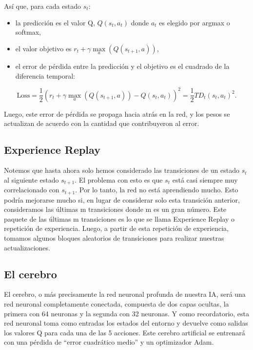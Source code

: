 \documentclass[]{book}
\providecommand{\tightlist}{%
  \setlength{\itemsep}{0pt}\setlength{\parskip}{0pt}}
\begin{document}
Así que, para cada estado \(s_t\):

\begin{itemize}
\tightlist
\item
  la predicción es el valor Q, \(Q (s_t, a_t)\) donde \(a_t\) es elegido por argmax o softmax,
\item
  el valor objetivo es \(r_t + \gamma \underset{a}{\max}(Q(s_{t+1}, a))\),
\item
  el error de pérdida entre la predicción y el objetivo es el cuadrado de la diferencia temporal:
\end{itemize}

\[\textrm{Loss} = \frac{1}{2} \left( r_t + \gamma \underset{a}{\max}(Q(s_{t+1}, a)) - Q(s_t, a_t) \right)^2 = \frac{1}{2} TD_t(s_t, a_t)^2.\]

Luego, este error de pérdida se propaga hacia atrás en la red, y los pesos se actualizan de acuerdo con la cantidad que contribuyeron al error.

\hypertarget{experience-replay}{%
\subsection{Experience Replay}\label{experience-replay}}

Notemos que hasta ahora solo hemos considerado las transiciones de un estado \(s_t\) al siguiente estado \(s_{t + 1}\). El problema con esto es que \(s_t\) está casi siempre muy correlacionado con \(s_{t + 1}\). Por lo tanto, la red no está aprendiendo mucho. Esto podría mejorarse mucho si, en lugar de considerar solo esta transición anterior, consideramos las últimas m transiciones donde m es un gran número. Este paquete de las últimas m transiciones es lo que se llama Experience Replay o repetición de experiencia. Luego, a partir de esta repetición de experiencia, tomamos algunos bloques aleatorios de transiciones para realizar nuestras actualizaciones.

\hypertarget{el-cerebro}{%
\subsection{El cerebro}\label{el-cerebro}}

El cerebro, o más precisamente la red neuronal profunda de nuestra IA, será una red neuronal completamente conectada, compuesta de dos capas ocultas, la primera con 64 neuronas y la segunda con 32 neuronas. Y como recordatorio, esta red neuronal toma como entradas los estados del entorno y devuelve como salidas los valores Q para cada una de las 5 acciones. Este cerebro artificial se entrenará con una pérdida de ``error cuadrático medio'' y un optimizador Adam.
\end{document}
